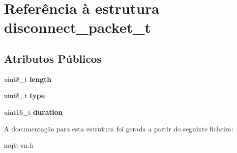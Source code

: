 \hypertarget{structdisconnect__packet__t}{\section{Referência à estrutura disconnect\+\_\+packet\+\_\+t}
\label{structdisconnect__packet__t}
}
\subsection*{Atributos Públicos}
\begin{DoxyCompactItemize}
\item 
\hypertarget{structdisconnect__packet__t_ae040bbd3cf30dc507447d3c3f03fdd2a}{uint8\+\_\+t {\bfseries length}}\label{structdisconnect__packet__t_ae040bbd3cf30dc507447d3c3f03fdd2a}

\item 
\hypertarget{structdisconnect__packet__t_a666b42d5da2d9c45a37515217f470932}{uint8\+\_\+t {\bfseries type}}\label{structdisconnect__packet__t_a666b42d5da2d9c45a37515217f470932}

\item 
\hypertarget{structdisconnect__packet__t_a4d0f4307f03380c20cfbed4b4a52737a}{uint16\+\_\+t {\bfseries duration}}\label{structdisconnect__packet__t_a4d0f4307f03380c20cfbed4b4a52737a}

\end{DoxyCompactItemize}


A documentação para esta estrutura foi gerada a partir do seguinte ficheiro\+:\begin{DoxyCompactItemize}
\item 
mqtt-\/sn.\+h\end{DoxyCompactItemize}

